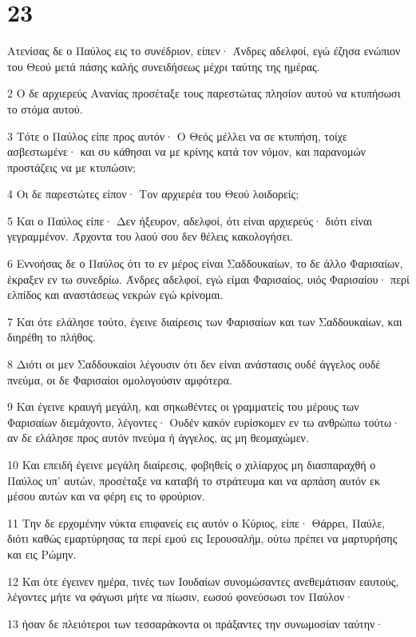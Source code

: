 \chapter{23}

\par Ατενίσας δε ο Παύλος εις το συνέδριον, είπεν· Άνδρες αδελφοί, εγώ έζησα ενώπιον του Θεού μετά πάσης καλής συνειδήσεως μέχρι ταύτης της ημέρας.
\par 2 Ο δε αρχιερεύς Ανανίας προσέταξε τους παρεστώτας πλησίον αυτού να κτυπήσωσι το στόμα αυτού.
\par 3 Τότε ο Παύλος είπε προς αυτόν· Ο Θεός μέλλει να σε κτυπήση, τοίχε ασβεστωμένε· και συ κάθησαι να με κρίνης κατά τον νόμον, και παρανομών προστάζεις να με κτυπώσιν;
\par 4 Οι δε παρεστώτες είπον· Τον αρχιερέα του Θεού λοιδορείς;
\par 5 Και ο Παύλος είπε· Δεν ήξευρον, αδελφοί, ότι είναι αρχιερεύς· διότι είναι γεγραμμένον. Άρχοντα του λαού σου δεν θέλεις κακολογήσει.
\par 6 Εννοήσας δε ο Παύλος ότι το εν μέρος είναι Σαδδουκαίων, το δε άλλο Φαρισαίων, έκραξεν εν τω συνεδρίω. Άνδρες αδελφοί, εγώ είμαι Φαρισαίος, υιός Φαρισαίου· περί ελπίδος και αναστάσεως νεκρών εγώ κρίνομαι.
\par 7 Και ότε ελάλησε τούτο, έγεινε διαίρεσις των Φαρισαίων και των Σαδδουκαίων, και διηρέθη το πλήθος.
\par 8 Διότι οι μεν Σαδδουκαίοι λέγουσιν ότι δεν είναι ανάστασις ουδέ άγγελος ουδέ πνεύμα, οι δε Φαρισαίοι ομολογούσιν αμφότερα.
\par 9 Και έγεινε κραυγή μεγάλη, και σηκωθέντες οι γραμματείς του μέρους των Φαρισαίων διεμάχοντο, λέγοντες· Ουδέν κακόν ευρίσκομεν εν τω ανθρώπω τούτω· αν δε ελάλησε προς αυτόν πνεύμα ή άγγελος, ας μη θεομαχώμεν.
\par 10 Και επειδή έγεινε μεγάλη διαίρεσις, φοβηθείς ο χιλίαρχος μη διασπαραχθή ο Παύλος υπ' αυτών, προσέταξε να καταβή το στράτευμα και να αρπάση αυτόν εκ μέσου αυτών και να φέρη εις το φρούριον.
\par 11 Την δε ερχομένην νύκτα επιφανείς εις αυτόν ο Κύριος, είπε· Θάρρει, Παύλε, διότι καθώς εμαρτύρησας τα περί εμού εις Ιερουσαλήμ, ούτω πρέπει να μαρτυρήσης και εις Ρώμην.
\par 12 Και ότε έγεινεν ημέρα, τινές των Ιουδαίων συνομώσαντες ανεθεμάτισαν εαυτούς, λέγοντες μήτε να φάγωσι μήτε να πίωσιν, εωσού φονεύσωσι τον Παύλον·
\par 13 ήσαν δε πλειότεροι των τεσσαράκοντα οι πράξαντες την συνωμοσίαν ταύτην·
